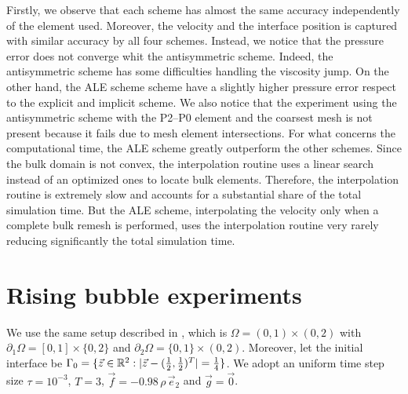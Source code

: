 Firstly, we observe that each scheme has almost the same accuracy independently
of the element used. Moreover, the velocity and the interface position is
captured with similar accuracy by all four schemes. Instead, we notice that the
pressure error does not converge whit the antisymmetric scheme. Indeed, the
antisymmetric scheme has some difficulties handling the viscosity jump. On the
other hand, the ALE scheme scheme have a slightly higher pressure error respect
to the explicit and implicit scheme. We also notice that the experiment using
the antisymmetric scheme with the P2--P0 element and the coarsest mesh is not
present because it fails due to mesh element intersections. For what concerns
the computational time, the ALE scheme greatly outperform the other schemes.
Since the bulk domain is not convex, the interpolation routine uses a linear
search instead of an optimized ones to locate bulk elements. Therefore, the
interpolation routine is extremely slow and accounts for a substantial share
of the total simulation time. But the ALE scheme, interpolating the velocity
only when a complete bulk remesh is performed, uses the interpolation routine
very rarely reducing significantly the total simulation time.

\section{Rising bubble experiments}\label{sec:2d_rising_bubble_results}
We use the same  setup described in \cite[Figure~2]{HysingTKPBGT09}, which is
${\Omega = (0,1) \times (0,2)}$ with $\partial_1\Omega = [0,1] \times \{0,2\}$
and $\partial_2\Omega = \{0,1\} \times (0,2)$. Moreover, let the initial
interface be ${\Gamma_0 = \{\vec z \in \mathbb R^2 : |\vec z - (\frac{1}{2},
\frac{1}{2})^T| = \frac{1}{4}\}}$.  We adopt an uniform time step size
$\tau=10^{-3}$, $T=3$, $\vec f = -0.98\,\rho\,\vec e_2$ and $\vec g=\vec 0$.

